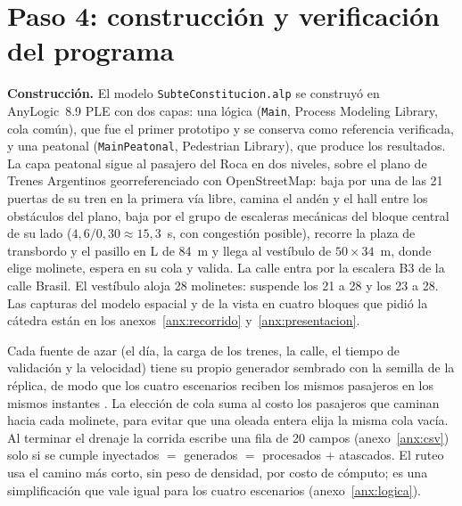 \section{Paso 4: construcción y verificación del programa}
\label{sec:paso4-construccion-verificacion}

\textbf{Construcción.} El modelo \texttt{SubteConstitucion.alp} se construyó en AnyLogic~8.9 PLE con dos capas:
una lógica (\texttt{Main}, Process Modeling Library, cola común), que fue el primer prototipo y se conserva como
referencia verificada, y una peatonal (\texttt{MainPeatonal}, Pedestrian Library), que produce los resultados.
La capa peatonal sigue al pasajero del Roca en dos niveles, sobre el plano de Trenes Argentinos georreferenciado
con OpenStreetMap: baja por una de las 21 puertas de su tren en la primera vía libre, camina el andén y el hall
entre los obstáculos del plano, baja por el grupo de escaleras mecánicas del bloque central de su lado
($4{,}6/0{,}30 \approx 15{,}3$~s, con congestión posible), recorre la plaza de transbordo y el pasillo en L de
84~m y llega al vestíbulo de $50 \times 34$~m, donde elige molinete, espera en su cola y valida. La calle entra
por la escalera B3 de la calle Brasil. El vestíbulo aloja 28 molinetes: \EO{} suspende los 21 a 28 y \EI{} los
23 a 28. Las capturas del modelo espacial y de la vista en cuatro bloques que pidió la cátedra están en los
anexos~\ref{anx:recorrido} y~\ref{anx:presentacion}.

Cada fuente de azar (el día, la carga de los trenes, la calle, el tiempo de validación y la velocidad) tiene su
propio generador sembrado con la semilla de la réplica, de modo que los cuatro escenarios reciben los mismos
pasajeros en los mismos instantes \parencite[cap.~11]{law2015}. La elección de cola suma al costo los pasajeros
que caminan hacia cada molinete, para evitar que una oleada entera elija la misma cola vacía. Al terminar el
drenaje la corrida escribe una fila de 20 campos (anexo~\ref{anx:csv}) solo si se cumple
inyectados $=$ generados $=$ procesados $+$ atascados. El ruteo usa el camino más corto, sin peso de densidad,
por costo de cómputo; es una simplificación que vale igual para los cuatro escenarios (anexo~\ref{anx:logica}).

